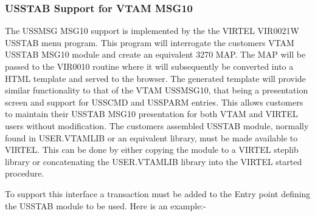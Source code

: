 \documentclass[letterpaper,10pt,english]{sphinxmanual}
\begin{document}
\subsubsection{USSTAB Support for VTAM MSG10}
\label{\detokenize{Installation_Guide:usstab-support-for-vtam-msg10}}\label{\detokenize{Installation_Guide:index-26}}
The USSMSG MSG10 support is implemented by the the VIRTEL VIR0021W USSTAB menu program. This program will interrogate the customers VTAM USSTAB MSG10 module and create an equivalent 3270 MAP. The MAP will be passed to the VIR0010 routine where it will subsequently be converted into a HTML template and served to the browser. The generated template will provide similar functionality to that of the VTAM USSMSG10, that being a presentation screen and support for USSCMD and USSPARM entries. This allows customers to maintain their USSTAB MSG10 presentation for both VTAM and VIRTEL users without modification. The customers assembled USSTAB module, normally found in USER.VTAMLIB or an equivalent library, must be made available to VIRTEL. This can be done by either copying the module to a VIRTEL steplib library or concatenating the USER.VTAMLIB library into the VIRTEL started procedure.

To support this interface a transaction must be added to the Entry point defining the USSTAB module to be used. Here is an example:-

\begin{sphinxVerbatim}[commandchars=\\\{\}]
      
 
 
 
 
 
 
 
\end{sphinxVerbatim}


\end{document}
